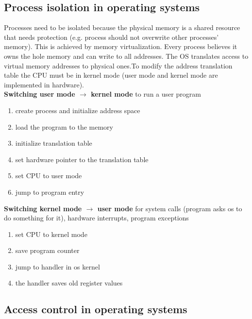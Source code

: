 \documentclass[12pt]{article}
\begin{document}
	\subsection{Process isolation in operating systems}
	Processes need to be isolated because the physical memory is a shared resource that needs protection (e.g. process should not overwrite other processes' memory). This is achieved by memory virtualization. Every process believes it owns the hole memory and can write to all addresses. The OS translates access to virtual memory addresses to physical ones.To modify the address translation table the CPU must be in kernel mode (user mode and kernel mode are implemented in hardware).\\
	\textbf{Switching user mode $\rightarrow$ kernel mode} to run a user program
	\begin{enumerate}
		\item create process and initialize address space
		\item load the program to the memory
		\item initialize translation table
		\item set hardware pointer to the translation table
		\item set CPU to user mode
		\item jump to program entry
	\end{enumerate}
	\textbf{Switching kernel mode $\rightarrow$ user mode} for system calls (program asks os to do something for it), hardware interrupts, program exceptions
	\begin{enumerate}
		\item set CPU to kernel mode
		\item save program counter
		\item jump to handler in os kernel
		\item the handler saves old register values
	\end{enumerate}

	\subsection{Access control in operating systems}
\end{document}
